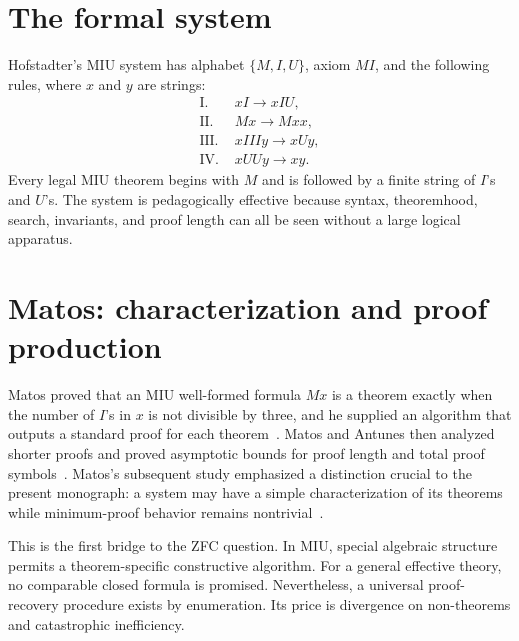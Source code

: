 \documentclass[11pt,oneside]{book}
\theoremstyle{definition}
\theoremstyle{remark}
\begin{document}
\section{The formal system}
Hofstadter's MIU system has alphabet $\{M,I,U\}$, axiom $MI$, and the following rules, where $x$ and $y$ are strings:
\begin{align*}
\text{I. }&xI \longrightarrow xIU,\\
\text{II. }&Mx \longrightarrow Mxx,\\
\text{III. }&xIIIy \longrightarrow xUy,\\
\text{IV. }&xUUy \longrightarrow xy.
\end{align*}
Every legal MIU theorem begins with $M$ and is followed by a finite string of $I$'s and $U$'s. The system is pedagogically effective because syntax, theoremhood, search, invariants, and proof length can all be seen without a large logical apparatus.

\section{Matos: characterization and proof production}
Matos proved that an MIU well-formed formula $Mx$ is a theorem exactly when the number of $I$'s in $x$ is not divisible by three, and he supplied an algorithm that outputs a standard proof for each theorem~\cite{matos1997}. Matos and Antunes then analyzed shorter proofs and proved asymptotic bounds for proof length and total proof symbols~\cite{matosantunes1998}. Matos's subsequent study emphasized a distinction crucial to the present monograph: a system may have a simple characterization of its theorems while minimum-proof behavior remains nontrivial~\cite{matos2000}.

This is the first bridge to the ZFC question. In MIU, special algebraic structure permits a theorem-specific constructive algorithm. For a general effective theory, no comparable closed formula is promised. Nevertheless, a universal proof-recovery procedure exists by enumeration. Its price is divergence on non-theorems and catastrophic inefficiency.
\end{document}
